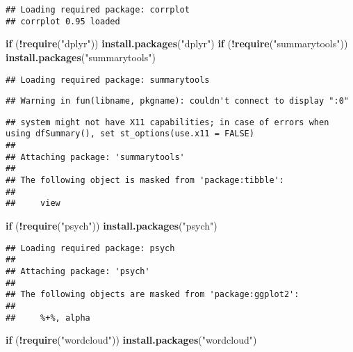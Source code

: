 \documentclass[
]{article}
\newenvironment{Shaded}{\begin{snugshade}}{\end{snugshade}}
\newcommand{\ControlFlowTok}[1]{\textcolor[rgb]{0.13,0.29,0.53}{\textbf{#1}}}
\newcommand{\FunctionTok}[1]{\textcolor[rgb]{0.13,0.29,0.53}{\textbf{#1}}}
\newcommand{\NormalTok}[1]{#1}
\newcommand{\SpecialCharTok}[1]{\textcolor[rgb]{0.81,0.36,0.00}{\textbf{#1}}}
\newcommand{\StringTok}[1]{\textcolor[rgb]{0.31,0.60,0.02}{#1}}
\begin{document}
\begin{verbatim}
## Loading required package: corrplot
## corrplot 0.95 loaded
\end{verbatim}

\begin{Shaded}
\begin{Highlighting}[]
\ControlFlowTok{if}\NormalTok{ (}\SpecialCharTok{!}\FunctionTok{require}\NormalTok{(}\StringTok{"dplyr"}\NormalTok{)) }\FunctionTok{install.packages}\NormalTok{(}\StringTok{"dplyr"}\NormalTok{)}
\ControlFlowTok{if}\NormalTok{ (}\SpecialCharTok{!}\FunctionTok{require}\NormalTok{(}\StringTok{"summarytools"}\NormalTok{)) }\FunctionTok{install.packages}\NormalTok{(}\StringTok{"summarytools"}\NormalTok{)}
\end{Highlighting}
\end{Shaded}

\begin{verbatim}
## Loading required package: summarytools
\end{verbatim}

\begin{verbatim}
## Warning in fun(libname, pkgname): couldn't connect to display ":0"
\end{verbatim}

\begin{verbatim}
## system might not have X11 capabilities; in case of errors when using dfSummary(), set st_options(use.x11 = FALSE)
## 
## Attaching package: 'summarytools'
## 
## The following object is masked from 'package:tibble':
## 
##     view
\end{verbatim}

\begin{Shaded}
\begin{Highlighting}[]
\ControlFlowTok{if}\NormalTok{ (}\SpecialCharTok{!}\FunctionTok{require}\NormalTok{(}\StringTok{"psych"}\NormalTok{)) }\FunctionTok{install.packages}\NormalTok{(}\StringTok{"psych"}\NormalTok{)}
\end{Highlighting}
\end{Shaded}

\begin{verbatim}
## Loading required package: psych
## 
## Attaching package: 'psych'
## 
## The following objects are masked from 'package:ggplot2':
## 
##     %+%, alpha
\end{verbatim}

\begin{Shaded}
\begin{Highlighting}[]
\ControlFlowTok{if}\NormalTok{ (}\SpecialCharTok{!}\FunctionTok{require}\NormalTok{(}\StringTok{"wordcloud"}\NormalTok{)) }\FunctionTok{install.packages}\NormalTok{(}\StringTok{"wordcloud"}\NormalTok{)}
\end{Highlighting}
\end{Shaded}
\end{document}
